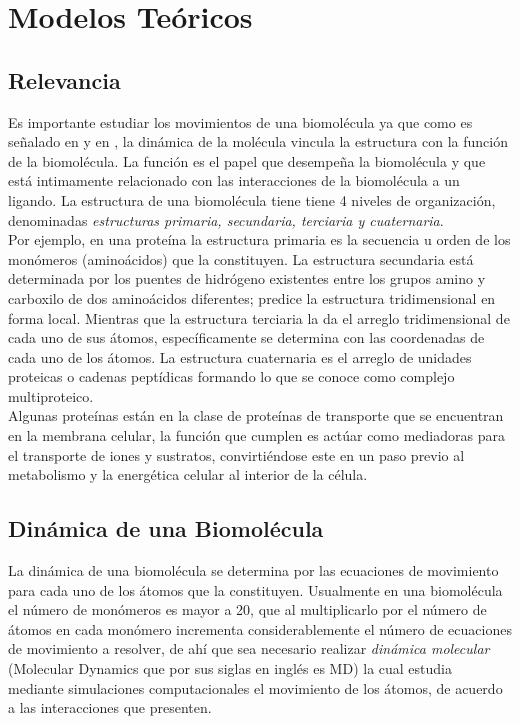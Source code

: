 \chapter{Modelos Te\'{o}ricos}
\section{Relevancia}
Es importante estudiar los movimientos de una biomol\'{e}cula ya que como es se\~{n}alado en \cite{Lezon2009ElasticViruses} y en  \cite{Rader2006TheApplications}, la din\'{a}mica de la mol\'{e}cula vincula la estructura con la funci\'{o}n de la biomol\'{e}cula. La funci\'{o}n es el papel que desempe\~{n}a la biomol\'{e}cula y que est\'{a} intimamente relacionado con las interacciones de la biomol\'{e}cula a un ligando. La estructura de una biomol\'{e}cula tiene tiene 4 niveles de organizaci\'{o}n, denominadas \textit{estructuras primaria, secundaria, terciaria y cuaternaria}.\\

Por ejemplo, en una prote\'{i}na la estructura primaria es la secuencia u  orden de los mon\'{o}meros (amino\'{a}cidos) que la constituyen. La estructura secundaria est\'{a} determinada por los puentes de hidr\'{o}geno existentes entre los grupos amino y carboxilo de dos amino\'{a}cidos diferentes; predice la estructura tridimensional en forma local. Mientras que la estructura terciaria la da el arreglo tridimensional de cada uno de sus \'{a}tomos, espec\'{i}ficamente se determina con las coordenadas de cada uno de los \'{a}tomos. La estructura cuaternaria es el arreglo de unidades proteicas o cadenas pept\'{i}dicas formando lo que se conoce como complejo multiproteico.\\

Algunas prote\'{i}nas est\'{a}n en la clase de prote\'{i}nas de transporte que se encuentran en la membrana celular, la funci\'{o}n que cumplen es act\'{u}ar como mediadoras para el transporte de iones y sustratos, convirti\'{e}ndose este en un paso previo al metabolismo y la energ\'{e}tica celular al interior de la c\'{e}lula.\\
\section{Din\'{a}mica de una Biomol\'{e}cula}

La din\'{a}mica de una biomol\'{e}cula se determina por las ecuaciones de movimiento para cada uno de los \'{a}tomos que la constituyen. Usualmente en una biomol\'{e}cula el n\'{u}mero de mon\'{o}meros es mayor a 20, que al multiplicarlo por el n\'{u}mero de \'{a}tomos en cada mon\'{o}mero incrementa considerablemente el n\'{u}mero de ecuaciones de movimiento a resolver, de ah\'{i} que sea necesario realizar \textit{din\'{a}mica molecular} (Molecular Dynamics que por sus siglas en ingl\'{e}s es MD) la cual estudia mediante simulaciones computacionales el movimiento de los \'{a}tomos, de acuerdo a las interacciones que presenten.\\

